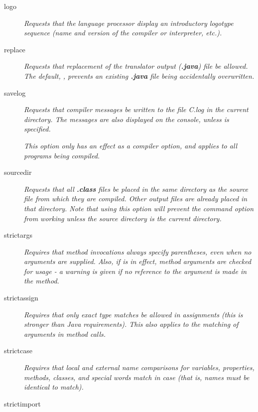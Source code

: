 \begin{description}
\item[logo]
\emph{Requests that the language processor display an introductory
logotype sequence (name and version of the compiler or interpreter,
\emph{etc.}).}
\item[replace]
\emph{Requests that replacement of the translator output
(\textbf{.java}) file be allowed.
The default, , prevents an existing \textbf{.java}
file being accidentally overwritten.}
\item[savelog]

\emph{Requests that compiler messages be written to the file \nr{}C.log in
the current directory.
The messages are also displayed on the console, unless
 is specified.}
 
\emph{This option only has an effect as a compiler option, and applies to all
programs being compiled.}
\item[sourcedir]

\emph{Requests that all \textbf{.class} files be placed in the same
directory as the source file from which they are compiled.  Other output
files are already placed in that directory.
Note that using this option will prevent the  command
option from working unless the source directory is the current
directory.}
\item[strictargs]

\emph{Requires that method invocations always specify parentheses, even
when no arguments are supplied.  Also, if  is in
effect, method arguments are checked for usage - a warning is given
if no reference to the argument is made in the method.}
\item[strictassign]
\emph{Requires that only exact type matches be allowed in assignments
(this is stronger than Java requirements).
This also applies to the matching of arguments in method calls.}
\item[strictcase]
\emph{Requires that local and external name comparisons for variables,
properties, methods, classes, and special words match in case (that is,
names must be identical to match).}
\item[strictimport]


\end{description}
